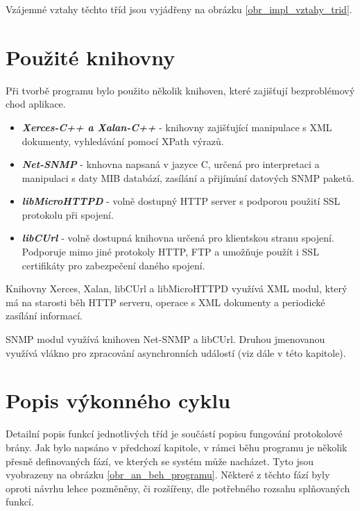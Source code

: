 Vzájemné vztahy těchto tříd jsou vyjádřeny na obrázku \ref{obr_impl_vztahy_trid}.



\section{Použité knihovny}
Při tvorbě programu bylo použito několik knihoven, které zajišťují bezproblémový chod aplikace.

\begin{itemize}
	\item \textbf{ \textit{Xerces-C++ a Xalan-C++} } - knihovny zajišťující manipulace s XML dokumenty, vyhledávání pomocí XPath výrazů.
	\item \textbf{ \textit{Net-SNMP} } - knhovna napsaná v jazyce C, určená pro interpretaci a manipulaci s daty MIB databází, zasílání a 
	přijímání datových SNMP paketů.
	\item \textbf{ \textit{libMicroHTTPD} } - volně dostupný HTTP server s podporou použití SSL protokolu při spojení.
	\item \textbf{ \textit{libCUrl} } - volně dostupná knihovna určená pro klientskou stranu spojení. Podporuje mimo jiné protokoly HTTP, FTP a
	umožňuje použít i SSL certifikáty pro zabezpečení daného spojení.
\end{itemize}

Knihovny Xerces, Xalan, libCUrl a libMicroHTTPD využívá XML modul, který má na starosti běh HTTP serveru, operace s XML dokumenty a periodické zasílání
informací.

SNMP modul využívá knihoven Net-SNMP a libCUrl. Druhou jmenovanou využívá vlákno pro zpracování asynchronních událostí (viz dále v této kapitole).


\section{Popis výkonného cyklu}
Detailní popis funkcí jednotlivých tříd je součástí popisu fungování protokolové brány. Jak bylo napsáno v předchozí kapitole,
v rámci běhu programu je několik přesně definovaných fází, ve kterých se systém může nacházet. Tyto jsou vyobrazeny na obrázku \ref{obr_an_beh_programu}.
Některé z těchto fází byly oproti návrhu lehce pozměněny, či rozšířeny, dle potřebného rozsahu splňovaných funkcí.

